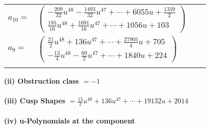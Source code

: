 \documentclass[1p]{elsarticle_modified}
\theoremstyle{definition}
\begin{document}
\begin{tabular}{m{7pt} m{180pt} m{7pt} m{180pt} }
\flushright $a_{10}=$&$\begin{pmatrix}-\frac{209}{32} u^{48}-\frac{1493}{32} u^{47}+\cdots+6055 u+\frac{1359}{2}\\\frac{185}{16} u^{48}+\frac{1691}{16} u^{47}+\cdots+1056 u+103\end{pmatrix}$ \\
\flushright $a_{9}=$&$\begin{pmatrix}\frac{21}{2} u^{48}+136 u^{47}+\cdots+\frac{27905}{4} u+705\\-\frac{13}{4} u^{48}-\frac{69}{2} u^{47}+\cdots+1840 u+224\end{pmatrix}$\\&\end{tabular}
\flushleft \textbf{(ii) Obstruction class $= -1$}\\~\\
\flushleft \textbf{(iii) Cusp Shapes $= \frac{13}{2} u^{48}+136 u^{47}+\cdots+19132 u+2014$}\\~\\
\newpage\renewcommand{\arraystretch}{1}
\flushleft \textbf{(iv) u-Polynomials at the component}\newline \\
\end{document}
